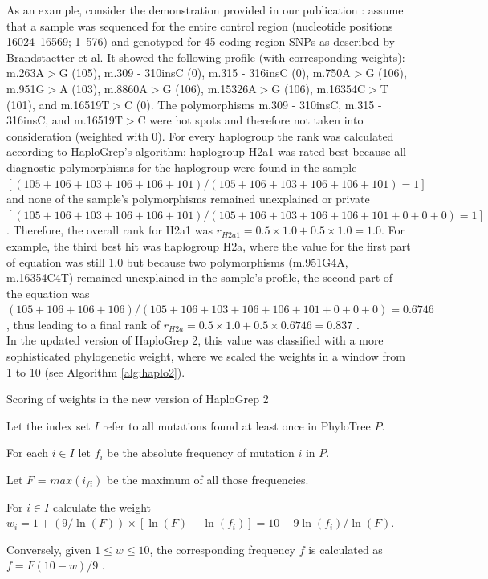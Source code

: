 As an example, consider the demonstration provided in our publication \cite{Kloss-Brandstatter2011}: assume that a sample was sequenced for the entire control region (nucleotide positions 16024–16569; 1–576) and genotyped for 45 coding region SNPs as described by Brandstaetter et al. It showed the following profile (with corresponding weights): m.263A$>$G (105), m.309 - 310insC (0), m.315 - 316insC (0), m.750A$>$G (106), m.951G$>$A (103), m.8860A$>$G (106), m.15326A$>$G (106), m.16354C$>$T (101), and m.16519T$>$C (0). The polymorphisms m.309 - 310insC, m.315 - 316insC, and m.16519T$>$C were hot spots and therefore not taken into consideration (weighted with 0). For every haplogroup the rank was calculated according to HaploGrep's algorithm: haplogroup H2a1 was rated best because all diagnostic polymorphisms for the haplogroup were found in the sample $[(105+106+103+106+106+101)/(105+106+103+106+106+101) = 1]$ and none of the sample’s polymorphisms remained unexplained or private $[(105+106+103+106+106+ 101)/(105+106+103+106+106+101+0+0+0)=1]$. Therefore, the overall rank for H2a1 was $r_{H2a1}=0.5\times 1.0 + 0.5 \times 1.0 = 1.0$. For example, the third best hit was haplogroup H2a, where the value for the first part of equation was still 1.0 but because two polymorphisms (m.951G4A, m.16354C4T) remained unexplained in the sample’s profile, the second part of the equation was $(105+106+106+106)/(105+106+103+106+106+101+0+0+0) = 0.6746$, thus leading to a final rank of $r_{H2a}= 0.5\times 1.0 + 0.5\times 0.6746 =0.837$ \cite{Kloss-Brandstatter2011}. \\
In the updated version of HaploGrep 2, this value was classified with a more sophisticated phylogenetic weight, where we scaled the weights in a window from 1 to 10 (see Algorithm \ref{alg:haplo2}).
\begin{algorithm}
\caption{Scoring of weights in the new version of HaploGrep 2}
\label{alg:haplo2}
Let the index set $I$ refer to all mutations found at least once in PhyloTree $P$.

For each $i \in I$ let $f_i$ be the absolute frequency of mutation $i$ in $P$. 

Let $F$ = $max(i_{fi})$ be the maximum of all those frequencies. 

For $i \in I$ calculate the weight $w_i = 1+(9/\ln(F)) \times [\ln(F) - \ln(f_i)] = 10-9\ln(f_i) / \ln(F)$. 

Conversely, given $1 \leq w \leq 10$, the corresponding frequency $f$ is calculated as  $f = F(10 - w)/9$ \cite{Weissensteiner2016b}.
\end{algorithm}

